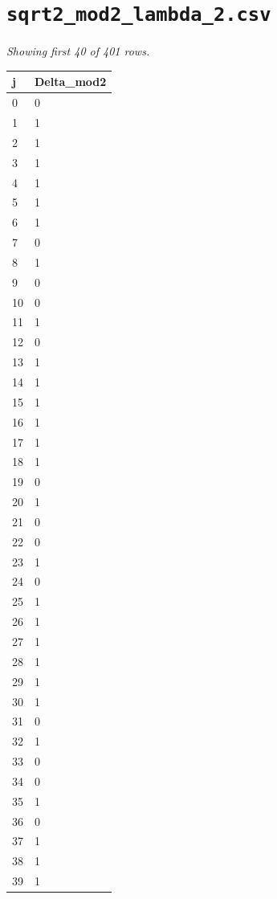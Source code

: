 \documentclass[10pt]{article}
\begin{document}
\section*{\texttt{sqrt2\_mod2\_lambda\_2.csv}}
\noindent\textit{Showing first 40 of 401 rows.}\par\medskip
{\footnotesize
\begin{longtable}{@{}ll@{}}
\toprule
\textbf{j} & \textbf{Delta\_mod2} \\
\midrule\endhead
0 & 0 \\
1 & 1 \\
2 & 1 \\
3 & 1 \\
4 & 1 \\
5 & 1 \\
6 & 1 \\
7 & 0 \\
8 & 1 \\
9 & 0 \\
10 & 0 \\
11 & 1 \\
12 & 0 \\
13 & 1 \\
14 & 1 \\
15 & 1 \\
16 & 1 \\
17 & 1 \\
18 & 1 \\
19 & 0 \\
20 & 1 \\
21 & 0 \\
22 & 0 \\
23 & 1 \\
24 & 0 \\
25 & 1 \\
26 & 1 \\
27 & 1 \\
28 & 1 \\
29 & 1 \\
30 & 1 \\
31 & 0 \\
32 & 1 \\
33 & 0 \\
34 & 0 \\
35 & 1 \\
36 & 0 \\
37 & 1 \\
38 & 1 \\
39 & 1 \\
\bottomrule
\end{longtable}}
\end{document}

